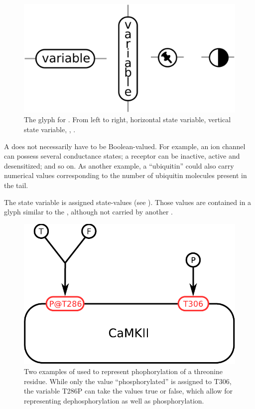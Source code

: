 \begin{figure}[H]
  \centering
  \includegraphics[scale = 0.3]{images/stateVariable}
  \caption{The \ER glyph for . From left to right, horizontal state variable, vertical state variable, , .}
  \label{fig:state-var}
\end{figure}

A  does not necessarily have to be Boolean-valued.  For example, an ion channel can possess several conductance states; a receptor can be inactive, active and desensitized; and so on.  As another example, a  ``ubiquitin'' could also carry numerical values corresponding to the number of ubiquitin molecules present in the tail.

The state variable is assigned state-values (see ). Those values are contained in a glyph similar to the , although not carried by another . 

\begin{figure}[H]
  \centering
  \includegraphics[scale = 0.5]{examples/ex-stateVariable}
  \caption{Two examples of  used to represent phophorylation of a threonine residue. While only the value ``phosphorylated'' is assigned to T306, the variable T286P can take the values true or false, which allow for representing dephosphorylation as well as phosphorylation.}
  \label{fig:ex-state-Variable}
\end{figure}


